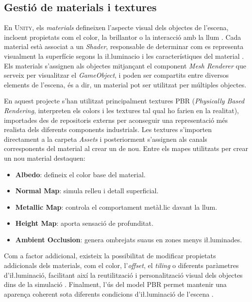\documentclass[a4paper,11pt,DIV=13,headings=normal,abstract=true,twoside=semi]{article}
\newcommand{\acro}[1]{\textsc{#1}}
\begin{document}
\subsection{Gestió de materials i textures} 

En \acro{Unity}, els \emph{materials} defineixen l'aspecte visual dels objectes de l'escena, incloent propietats com el color, la brillantor o la interacció amb la llum \cite{UnityMaterialsIntro}. Cada material està associat a un \emph{Shader}, responsable de determinar com es representa visualment la superfície segons la i\l.luminacio i les característiques del material \cite{UnityShaders}. Els materials s'assignen als objectes mitjançant el component \emph{Mesh Renderer} que serveix per visualitzar el \emph{GameObject}, i poden ser compartits entre diversos elements de l'escena, és a dir, un material pot ser utilitzat per múltiples objectes.%

En aquest projecte s'han utilitzat principalment textures \acro{PBR} (\emph{Physically Based Rendering}, interpreten els colors i les textures tal qual ho farien en la realitat), importades des de repositoris externs per aconseguir una representació més realista dels diferents components industrials. Les textures s'importen directament a la carpeta \emph{Assets} i posteriorment s'assignen als canals corresponents del material \cite{UnityImportTextures} al crear un de nou. Entre els mapes utilitzats per crear un nou material destaquen: 
\begin{itemize} 
    \item \textbf{Albedo}: defineix el color base del material. 
    \item \textbf{Normal Map}: simula relleu i detall superficial. 
    \item \textbf{Metallic Map}: controla el comportament metà\l.lic davant la llum. 
    \item \textbf{Height Map}: aporta sensació de profunditat. 
    \item \textbf{Ambient Occlusion}: genera ombrejats suaus en zones menys i\l.luminades. 
\end{itemize} 

Com a factor addicional, existeix la possibilitat  de modificar propietats addicionals dels materials, com el color, l'\emph{offset}, el \emph{tiling} o diferents paràmetres d'i\l.luminació, facilitant així la reutilització i personalització visual dels objectes dins de la simulació \cite{UnityTextureProperties}. Finalment, l'ús del model \acro{PBR} permet mantenir una aparença coherent sota diferents condicions d'i\l.luminació de l'escena \cite{UnityMaterialsIntro}. 
\end{document}
